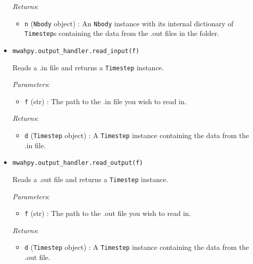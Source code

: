 \documentclass{article}
\begin{document}
\begin{itemize}
\begin{itemize}
\end{itemize}

\textit{Returns}: \begin{itemize} 

\item \verb!n! (\verb!Nbody! object) : An \verb!Nbody! instance with its internal dictionary of \verb!Timestep!s containing the data from the .out files in the folder.

\end{itemize}



\item \verb!mwahpy.output_handler.read_input(f)!

Reads a .in file and returns a \verb!Timestep! instance.

\textit{Parameters}: \begin{itemize}

\item \verb!f! (str) : The path to the .in file you wish to read in.

\end{itemize}

\textit{Returns}: \begin{itemize} 

\item \verb!d! (\verb!Timestep! object) : A \verb!Timestep! instance containing the data from the .in file.

\end{itemize}



\item \verb!mwahpy.output_handler.read_output(f)!

Reads a .out file and returns a \verb!Timestep! instance.

\textit{Parameters}: \begin{itemize}

\item \verb!f! (str) : The path to the .out file you wish to read in.

\end{itemize}

\textit{Returns}: \begin{itemize} 

\item \verb!d! (\verb!Timestep! object) : A \verb!Timestep! instance containing the data from the .out file.

\end{itemize}




\end{itemize}
\end{document}
